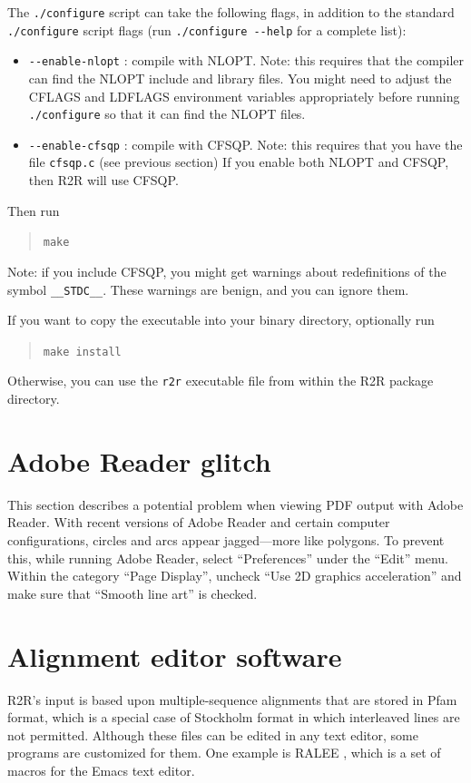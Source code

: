 \documentclass[letterpaper,12pt]{report}
\begin{document}
The {\tt ./configure} script can take the following flags, in addition to the standard {\tt ./configure} script flags (run {\tt ./configure -{}-help} for a complete list):
\begin{itemize}
\item {\tt -{}-enable-nlopt} : compile with NLOPT.  Note: this requires that the compiler can find the NLOPT include and library files.  You might need to adjust the CFLAGS and LDFLAGS environment variables appropriately before running {\tt ./configure} so that it can find the NLOPT files.
\item {\tt -{}-enable-cfsqp} : compile with CFSQP.  Note: this requires that you have the file {\tt cfsqp.c} (see previous section)  If you enable both NLOPT and CFSQP, then R2R will use CFSQP.
\end{itemize}

Then run
\begin{quote}
{\tt make}
\end{quote}
Note: if you include CFSQP, you might get warnings about redefinitions of the symbol {\tt \_\_STDC\_\_}.  These warnings are benign, and you can ignore them.

If you want to copy the executable into your binary directory, optionally run
\begin{quote}
{\tt make install}
\end{quote}
Otherwise, you can use the {\tt r2r} executable file from within the R2R package directory.

\section{Adobe Reader glitch}
\label{sec:SillyReader}

This section describes a potential problem when viewing PDF output with Adobe Reader.  With recent versions of Adobe Reader and certain computer configurations, circles and arcs appear jagged---more like polygons.  To prevent this, while running Adobe Reader, select ``Preferences'' under the ``Edit'' menu.  Within the category ``Page Display'', uncheck ``Use 2D graphics acceleration'' and make sure that ``Smooth line art'' is checked.

\section{Alignment editor software}

R2R's input is based upon multiple-sequence alignments that are
stored in Pfam format, which is a special case of Stockholm format in which interleaved lines are not permitted.
Although these files can be edited in any text editor, some programs
are customized for them.
One example is RALEE \cite{RALEE}, which is a set of macros for
the Emacs text editor.
\end{document}
